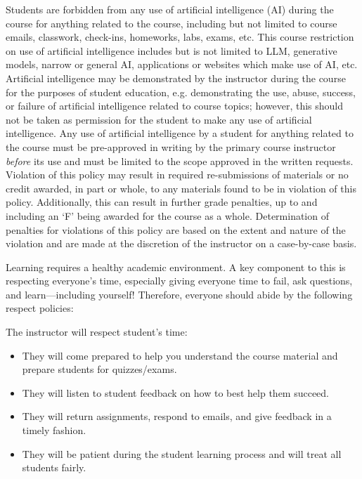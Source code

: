 \documentclass[11pt,letterpaper]{article}
\begin{document}
Students are forbidden from any use of artificial intelligence (AI) during the course for anything related to the course, including but not limited to course emails, classwork, check-ins, homeworks, labs, exams, etc. This course restriction on use of artificial intelligence includes but is not limited to LLM, generative models, narrow or general AI, applications or websites which make use of AI, etc. Artificial intelligence may be demonstrated by the instructor during the course for the purposes of student education, e.g. demonstrating the use, abuse, success, or failure of artificial intelligence related to course topics; however, this should not be taken as permission for the student to make any use of artificial intelligence. Any use of artificial intelligence by a student for anything related to the course must be pre-approved in writing by the primary course instructor \textit{before} its use and must be limited to the scope approved in the written requests. Violation of this policy may result in required re-submissions of materials or no credit awarded, in part or whole, to any materials found to be in violation of this policy. Additionally, this can result in further grade penalties, up to and including an `F' being awarded for the course as a whole. Determination of penalties for violations of this policy are based on the extent and nature of the violation and are made at the discretion of the instructor on a case-by-case basis. 
\sectionbreak




Learning requires a healthy academic environment. A key component to this is respecting everyone's time, especially giving everyone time to fail, ask questions, and learn---including yourself! Therefore, everyone should abide by the following respect policies: \pspace

The instructor will respect student's time:
	\begin{itemize}
	\item They will come prepared to help you understand the course material and prepare students for quizzes/exams. 
	\item They will listen to student feedback on how to best help them succeed. 
	\item They will return assignments, respond to emails, and give feedback in a timely fashion. 
	\item They will be patient during the student learning process and will treat all students fairly. 
	\end{itemize} \pspace
\end{document}
